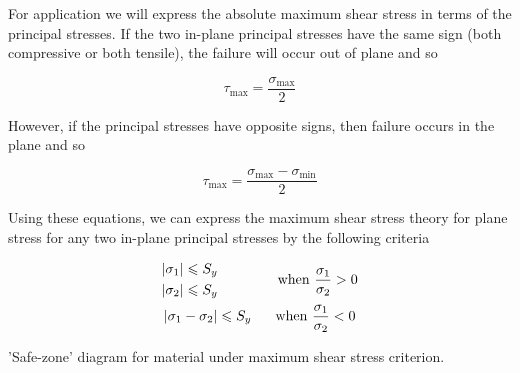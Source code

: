 \documentclass[
fontsize=10pt,
a4paper,
twosides=false,
open=any,
svgnames,
]{kaobook} %
\begin{document}
For application we will express the absolute maximum shear stress in terms of the principal stresses. If the two in-plane principal stresses have the same sign (both compressive or both tensile), the failure will occur out of plane and so

\begin{equation}
  \tau _{\max } = \frac{\sigma _{\max }}{2}
\end{equation}

However, if the principal stresses have opposite signs, then failure occurs in the plane and so

\begin{equation}
  \tau _{\max } = \frac{\sigma_{\max } - \sigma _{\min }}{2}
\end{equation}

Using these equations, we can express the maximum shear stress theory for plane stress for any two in-plane principal stresses by the following criteria

\begin{equation}
  \begin{gathered}
    \begin{gathered}
      \left| \sigma_1 \right| \leqslant S_y \hfill \\
      \left| \sigma_2 \right| \leqslant S_y \hfill \\ 
    \end{gathered}  \hspace{1.5cm} \text{when } \dfrac{\sigma _1}{\sigma _2} > 0  \\
    \left| \sigma _1 - \sigma _2 \right| \leqslant S_y \hspace{0.6cm} \text{when } \dfrac{\sigma _1}{\sigma _2} < 0 \\ 
  \end{gathered}
\end{equation}

\begin{marginfigure}
  \centering
  \caption{'Safe-zone' diagram for material under maximum shear stress criterion.}
  \label{fig: MSST safe zone}
\end{marginfigure}
\end{document}
